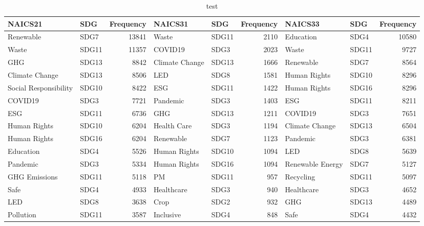 \begin{table}

\caption{test}
\centering
\begin{tabular}[t]{llrllrllr}
\toprule
NAICS21 & SDG & Frequency & NAICS31 & SDG  & Frequency  & NAICS33 & SDG   & Frequency  \\
\midrule
Renewable & SDG7 & 13841 & Waste & SDG11 & 2110 & Education & SDG4 & 10580\\
Waste & SDG11 & 11357 & COVID19 & SDG3 & 2023 & Waste & SDG11 & 9727\\
GHG & SDG13 & 8842 & Climate Change & SDG13 & 1666 & Renewable & SDG7 & 8564\\
Climate Change & SDG13 & 8506 & LED & SDG8 & 1581 & Human Rights & SDG10 & 8296\\
Social Responsibility & SDG10 & 8422 & ESG & SDG11 & 1422 & Human Rights & SDG16 & 8296\\
\addlinespace
COVID19 & SDG3 & 7721 & Pandemic & SDG3 & 1403 & ESG & SDG11 & 8211\\
ESG & SDG11 & 6736 & GHG & SDG13 & 1211 & COVID19 & SDG3 & 7651\\
Human Rights & SDG10 & 6204 & Health Care & SDG3 & 1194 & Climate Change & SDG13 & 6504\\
Human Rights & SDG16 & 6204 & Renewable & SDG7 & 1123 & Pandemic & SDG3 & 6381\\
Education & SDG4 & 5526 & Human Rights & SDG10 & 1094 & LED & SDG8 & 5639\\
\addlinespace
Pandemic & SDG3 & 5334 & Human Rights & SDG16 & 1094 & Renewable Energy & SDG7 & 5127\\
GHG Emissions & SDG11 & 5118 & PM & SDG11 & 957 & Recycling & SDG11 & 5097\\
Safe & SDG4 & 4933 & Healthcare & SDG3 & 940 & Healthcare & SDG3 & 4652\\
LED & SDG8 & 3638 & Crop & SDG2 & 932 & GHG & SDG13 & 4489\\
Pollution & SDG11 & 3587 & Inclusive & SDG4 & 848 & Safe & SDG4 & 4432\\
\bottomrule
\end{tabular}
\end{table}
